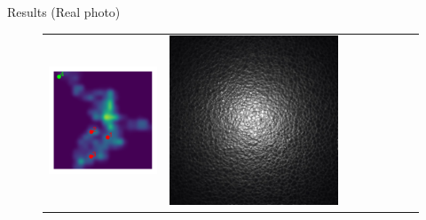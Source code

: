 \documentclass[final]{beamer}
\newlength{\twocolwid}
\newlength{\resultwidth}
\begin{document}
\begin{frame}[t]
\begin{columns}[t]
\begin{column}{\twocolwid}
\begin{block}{Results (Real photo)}
\begin{figure}[t]
\begin{tabular}{ccrclccc}
            		\includegraphics[width=\resultwidth]{images/real/leather/posterior.pdf} &
            		\includegraphics[width=\resultwidth]{images/real/leather/good1.jpg} &

\end{tabular}
\end{figure}
\end{block}
\end{column}
\end{columns}
\end{frame}
\end{document}
